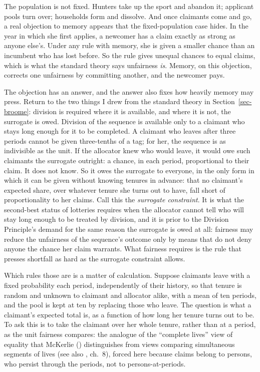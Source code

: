 \documentclass[
  11pt,
  letterpaper,
  DIV=11,
  numbers=noendperiod,
  twoside]{scrartcl}
\begin{document}
The population is not fixed. Hunters take up the sport and abandon it;
applicant pools turn over; households form and dissolve. And once
claimants come and go, a real objection to memory appears that the
fixed-population case hides. In the year in which she first applies, a
newcomer has a claim exactly as strong as anyone else's. Under any rule
with memory, she is given a smaller chance than an incumbent who has
lost before. So the rule gives unequal chances to equal claims, which is
what the standard theory says unfairness \emph{is}. Memory, on this
objection, corrects one unfairness by committing another, and the
newcomer pays.

The objection has an answer, and the answer also fixes how heavily
memory may press. Return to the two things I drew from the standard
theory in Section~\ref{sec-broome}: division is required where it is
available, and where it is not, the surrogate is owed. Division of the
sequence is available only to a claimant who stays long enough for it to
be completed. A claimant who leaves after three periods cannot be given
three-tenths of a tag; for her, the sequence is as indivisible as the
unit. If the allocator knew who would leave, it would owe such claimants
the surrogate outright: a chance, in each period, proportional to their
claim. It does not know. So it owes the surrogate to everyone, in the
only form in which it can be given without knowing tenures in advance:
that no claimant's expected share, over whatever tenure she turns out to
have, fall short of proportionality to her claims. Call this the
\emph{surrogate constraint}. It is what the second-best status of
lotteries requires when the allocator cannot tell who will stay long
enough to be treated by division, and it is prior to the Division
Principle's demand for the same reason the surrogate is owed at all:
fairness may reduce the unfairness of the sequence's outcome only by
means that do not deny anyone the chance her claim warrants. What
fairness requires is the rule that presses shortfall as hard as the
surrogate constraint allows.

Which rules those are is a matter of calculation. Suppose claimants
leave with a fixed probability each period, independently of their
history, so that tenure is random and unknown to claimant and allocator
alike, with a mean of ten periods, and the pool is kept at ten by
replacing those who leave. The question is what a claimant's expected
total is, as a function of how long her tenure turns out to be. To ask
this is to take the claimant over her whole tenure, rather than at a
period, as the unit fairness compares: the analogue of the ``complete
lives'' view of equality that McKerlie
() distinguishes from views comparing
simultaneous segments of lives (see also
, ch.~8), forced here because
claims belong to persons, who persist through the periods, not to
persons-at-periods.
\end{document}
